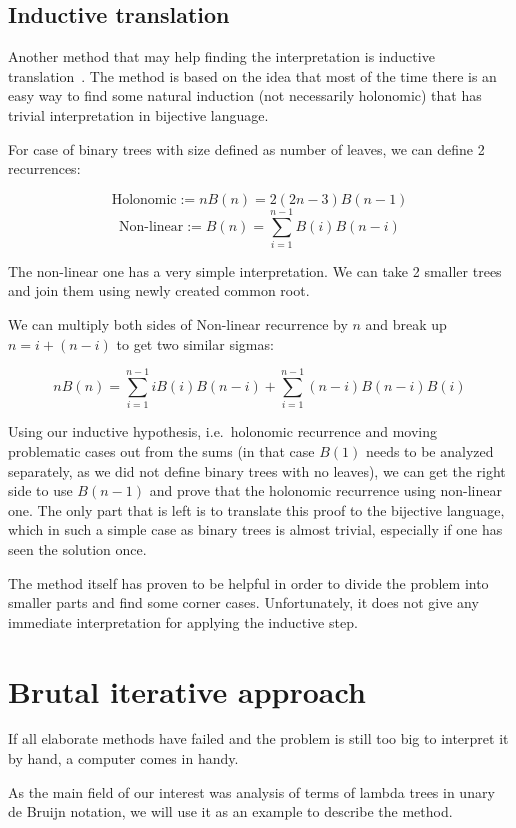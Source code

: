 \documentclass[final]{article}
\theoremstyle{definition}
\theoremstyle{remark}
\begin{document}
\subsection{Inductive translation}%
\label{sub:inductive_translation}

Another method that may help finding the interpretation is inductive translation~\cite{doron}. The method is based on the idea that most of the time there is an easy way to find some natural induction (not necessarily holonomic) that has trivial interpretation in bijective language.

For case of binary trees with size defined as number of leaves, we can define 2 recurrences:

\[\text{Holonomic} := nB(n) = 2 (2n - 3)B(n - 1)\]
\[\text{Non-linear} := B(n) = \sum_{i=1}^{n - 1} B(i) B(n - i)\]

The non-linear one has a very simple interpretation. We can take 2 smaller trees and join them using newly created common root.

We can multiply both sides of Non-linear recurrence by \(n\) and break up \(n = i + (n - i)\) to get two similar sigmas:

\[n B(n) = \sum_{i=1}^{n - 1} i B(i) B(n - i) + \sum_{i=1}^{n - 1} (n - i) B(n - i) B(i)\]

Using our inductive hypothesis, i.e.\ holonomic recurrence and moving problematic cases out from the sums (in that case \(B(1)\) needs to be analyzed separately, as we did not define binary trees with no leaves), we can get the right side to use \(B(n - 1)\) and prove that the holonomic recurrence using non-linear one. The only part that is left is to translate this proof to the bijective language, which in such a simple case as binary trees is almost trivial, especially if one has seen the solution once.

The method itself has proven to be helpful in order to divide the problem into smaller parts and find some corner cases. Unfortunately, it does not give any immediate interpretation for applying the inductive step.

\section{Brutal iterative approach}%
\label{sec:brutal_iterative_approach}

If all elaborate methods have failed and the problem is still too big to interpret it by hand, a computer comes in handy.

As the main field of our interest was analysis of terms of lambda trees in unary de Bruijn notation, we will use it as an example to describe the method.
\end{document}
